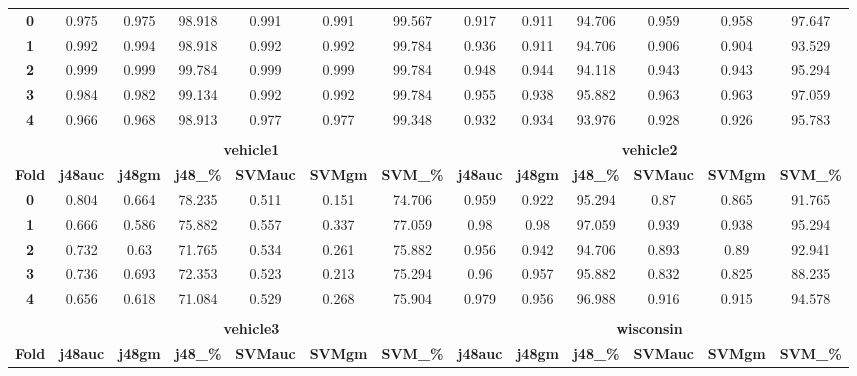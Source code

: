 {{\begin{tabular}{c|cccccc|cccccc}
\midrule
\textbf{0} & 0.975 & 0.975 & 98.918 & 0.991 & 0.991 & 99.567 & 0.917 & 0.911 & 94.706 & 0.959 & 0.958 & 97.647 \\
\textbf{1} & 0.992 & 0.994 & 98.918 & 0.992 & 0.992 & 99.784 & 0.936 & 0.911 & 94.706 & 0.906 & 0.904 & 93.529 \\
\textbf{2} & 0.999 & 0.999 & 99.784 & 0.999 & 0.999 & 99.784 & 0.948 & 0.944 & 94.118 & 0.943 & 0.943 & 95.294 \\
\textbf{3} & 0.984 & 0.982 & 99.134 & 0.992 & 0.992 & 99.784 & 0.955 & 0.938 & 95.882 & 0.963 & 0.963 & 97.059 \\
\textbf{4} & 0.966 & 0.968 & 98.913 & 0.977 & 0.977 & 99.348 & 0.932 & 0.934 & 93.976 & 0.928 & 0.926 & 95.783 \\
\multicolumn{1}{c}{} &       &       &       &       &       & \multicolumn{1}{c}{} &       &       &       &       &       &  \\
\multicolumn{1}{c}{} & \multicolumn{6}{c|}{\textbf{vehicle1}}        & \multicolumn{6}{c}{\textbf{vehicle2}} \\
\midrule
\textbf{Fold} & \textbf{j48auc} & \textbf{j48gm} & \textbf{j48\_\%} & \textbf{SVMauc} & \textbf{SVMgm} & \textbf{SVM\_\%} & \textbf{j48auc} & \textbf{j48gm} & \textbf{j48\_\%} & \textbf{SVMauc} & \textbf{SVMgm} & \textbf{SVM\_\%} \\
\midrule
\textbf{0} & 0.804 & 0.664 & 78.235 & 0.511 & 0.151 & 74.706 & 0.959 & 0.922 & 95.294 & 0.87  & 0.865 & 91.765 \\
\textbf{1} & 0.666 & 0.586 & 75.882 & 0.557 & 0.337 & 77.059 & 0.98  & 0.98  & 97.059 & 0.939 & 0.938 & 95.294 \\
\textbf{2} & 0.732 & 0.63  & 71.765 & 0.534 & 0.261 & 75.882 & 0.956 & 0.942 & 94.706 & 0.893 & 0.89  & 92.941 \\
\textbf{3} & 0.736 & 0.693 & 72.353 & 0.523 & 0.213 & 75.294 & 0.96  & 0.957 & 95.882 & 0.832 & 0.825 & 88.235 \\
\textbf{4} & 0.656 & 0.618 & 71.084 & 0.529 & 0.268 & 75.904 & 0.979 & 0.956 & 96.988 & 0.916 & 0.915 & 94.578 \\
\multicolumn{1}{c}{} &       &       &       &       &       & \multicolumn{1}{c}{} &       &       &       &       &       &  \\
\multicolumn{1}{c}{} & \multicolumn{6}{c|}{\textbf{vehicle3}}        & \multicolumn{6}{c}{\textbf{wisconsin}} \\
\midrule
\textbf{Fold} & \textbf{j48auc} & \textbf{j48gm} & \textbf{j48\_\%} & \textbf{SVMauc} & \textbf{SVMgm} & \textbf{SVM\_\%} & \textbf{j48auc} & \textbf{j48gm} & \textbf{j48\_\%} & \textbf{SVMauc} & \textbf{SVMgm} & \textbf{SVM\_\%} \\

\end{tabular}}}
